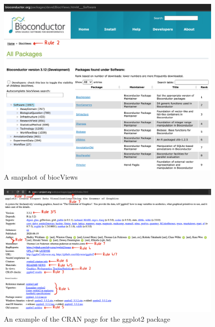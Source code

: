 \documentclass[10pt,letterpaper]{article}
\begin{document}
\begin{figure}
\includegraphics[width=1\linewidth]{../figures/biocViews} \caption{A snapshot of biocViews}\label{fig:biocViews}
\end{figure}

\begin{figure}
\includegraphics[width=1\linewidth]{../figures/cran_ggplot2} \caption{An example of the CRAN page for the ggplot2 package}\label{fig:cran_ggplot2}
\end{figure}
\end{document}
